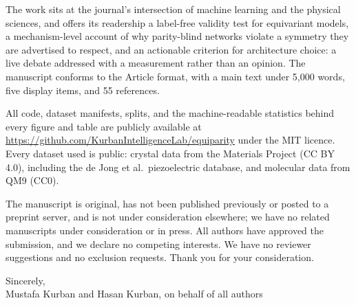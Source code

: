 \documentclass[11pt]{article}
\begin{document}
The work sits at the journal's intersection of machine learning and the physical sciences, and offers its readership a label-free validity test for equivariant models, a mechanism-level account of why parity-blind networks violate a symmetry they are advertised to respect, and an actionable criterion for architecture choice: a live debate addressed with a measurement rather than an opinion. The manuscript conforms to the Article format, with a main text under 5,000 words, five display items, and 55 references.

All code, dataset manifests, splits, and the machine-readable statistics behind every figure and table are publicly available at \url{https://github.com/KurbanIntelligenceLab/equiparity} under the MIT licence. Every dataset used is public: crystal data from the Materials Project (CC BY 4.0), including the de Jong et al.\ piezoelectric database, and molecular data from QM9 (CC0).

The manuscript is original, has not been published previously or posted to a preprint server, and is not under consideration elsewhere; we have no related manuscripts under consideration or in press. All authors have approved the submission, and we declare no competing interests. We have no reviewer suggestions and no exclusion requests. Thank you for your consideration.

\nopagebreak
Sincerely,\\
Mustafa Kurban and Hasan Kurban, on behalf of all authors
\end{document}
